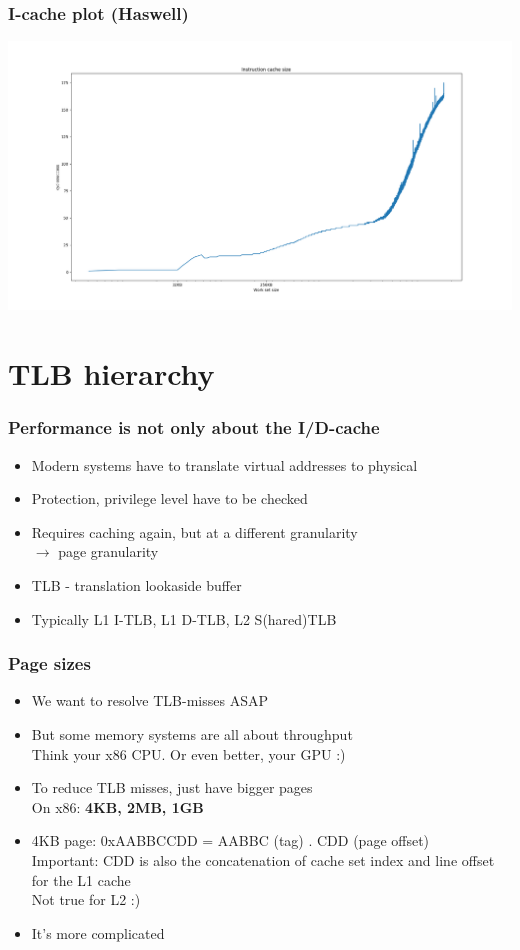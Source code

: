 \documentclass{beamer}
\begin{document}
\begin{frame}
\frametitle{I-cache plot (Haswell)}
\centerline{\includegraphics[scale=.3]{img/instr_size_haswell.png}}
\end{frame}

\section{TLB hierarchy}

\begin{frame}
\frametitle{Performance is not only about the I/D-cache}
\begin{itemize}
\item Modern systems have to translate virtual addresses to physical
\item Protection, privilege level have to be checked
\item Requires caching again, but at a different granularity\\
$\rightarrow$ page granularity
\item TLB - translation lookaside buffer
\item Typically L1 I-TLB, L1 D-TLB, L2 S(hared)TLB 
\end{itemize}
\end{frame}

\begin{frame}
\frametitle{Page sizes}
\begin{itemize}
\item We want to resolve TLB-misses ASAP
\item But some memory systems are all about throughput\\
Think your x86 CPU. Or even better, your GPU :)
\item To reduce TLB misses, just have bigger pages\\
On x86: \textbf{4KB, 2MB, 1GB}
\item 4KB page: 0xAABBCCDD = AABBC (tag) . CDD (page offset)\\
Important: CDD is also the concatenation of cache set index and line offset for the L1 cache\\
Not true for L2 :)
\item It's more complicated
\end{itemize}
\end{frame}
\end{document}
